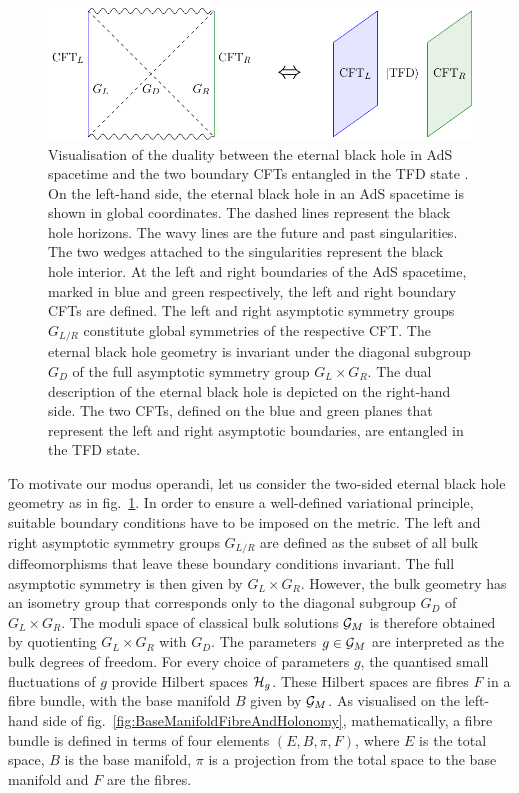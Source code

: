\documentclass[a4paper,11pt]{article}
\newcommand{\1}{\mathds{1}}
\begin{document}
\begin{figure}[b]
    \centering
    \includegraphics{EternalBlackHole.pdf}
    \caption{Visualisation of the duality between the eternal black hole in AdS spacetime and the two boundary CFTs entangled in the TFD state \cite{Maldacena:2001kr,VanRaamsdonk:2010pw,Maldacena:2013xja}. On the left-hand side, the eternal black hole in an AdS spacetime is shown in global coordinates. The dashed lines represent the black hole horizons. The wavy lines are the future and past singularities. The two wedges attached to the singularities represent the black hole interior. At the left and right boundaries of the AdS spacetime, marked in blue and green respectively, the left and right boundary CFTs are defined. The left and right asymptotic symmetry groups $G_{L/R}$ constitute global symmetries of the respective CFT. The eternal black hole geometry is invariant under the diagonal subgroup $G_D$ of the full asymptotic symmetry group $G_L\times G_R$. The dual description of the eternal black hole is depicted on the right-hand side. The two CFTs, defined on the blue and green planes that represent the left and right asymptotic boundaries, are entangled in the TFD state.}
    \label{fig:EternalBlackHole}
\end{figure}

To motivate our modus operandi, let us consider the two-sided eternal black hole geometry as in fig.~\ref{fig:EternalBlackHole}. In order to ensure a well-defined variational principle, suitable boundary conditions have to be imposed on the metric. The left and right asymptotic symmetry groups $G_{L/R}$ are defined as the subset of all bulk diffeomorphisms that leave these boundary conditions invariant. The full asymptotic symmetry is then given by $G_L\times G_R$. However, the bulk geometry has an isometry group that corresponds only to the diagonal subgroup $G_D$ of $G_L\times G_R$. The moduli space of classical bulk solutions ${\cal G}_M$ is therefore obtained by quotienting $G_L\times G_R$ with $G_D$. The parameters $g\in{\cal G}_M$ are interpreted as the bulk degrees of freedom. For every choice of parameters $g$, the quantised small fluctuations of $g$ provide Hilbert spaces ${\cal H}_g$. These Hilbert spaces are fibres $F$ in a fibre bundle, with the base manifold $B$ given by ${\cal G}_M$. As visualised on the left-hand side of fig.~\ref{fig:BaseManifoldFibreAndHolonomy}, mathematically, a fibre bundle is defined in terms of four elements $(E,B,\pi,F)$, where $E$ is the total space, $B$ is the base manifold, $\pi$ is a projection from the total space to the base manifold and $F$ are the fibres.
\end{document}
